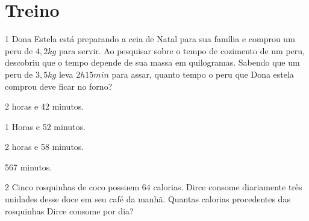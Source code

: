 \section*{Treino}

\num{1} Dona Estela está preparando a ceia de Natal para sua família e
comprou um peru de $4,2 kg$ para servir. Ao pesquisar sobre o tempo de
cozimento de um peru, descobriu que o tempo depende de sua massa em
quilogramas. Sabendo que um peru de $3,5 kg$ leva $2h 15min$ para assar,
quanto tempo o peru que Dona estela comprou deve ficar no forno?

\begin{escolha}[itemsep=0pt]
\item 2 horas e 42 minutos.
\item 1 Horas e 52 minutos.
\item 2 horas e 58 minutos.
\item 567 minutos.
\end{escolha}










\num{2} Cinco rosquinhas de coco possuem $64$ calorias. Dirce consome diariamente três
unidades desse doce em seu café da manhã. Quantas calorias procedentes
das rosquinhas Dirce consome por dia?

